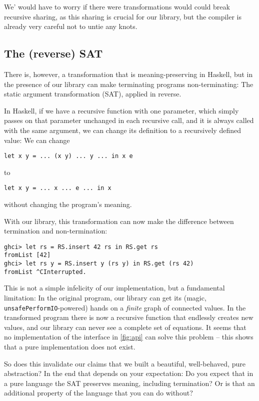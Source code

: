 \documentclass[manuscript,screen,acmsmall]{acmart}
\begin{document}
We’ would have to worry if there were transformations would could break recursive sharing, as this sharing is crucial for our library, but the compiler is already very careful not to untie any knots.

\subsection{The (reverse) SAT}\label{sec:sat}

There is, however, a transformation that is meaning-preserving in Haskell, but in the presence of our library can make terminating programs non-terminating:
The static argument transformation (SAT), applied in reverse.

In Haskell, if we have a recursive function with one parameter, which simply passes on that parameter unchanged in each recursive call, and it is always called with the same argument, we can change its definition to a recursively defined value: We can change
\begin{verbatim}
let x y = ... (x y) ... y ... in x e
\end{verbatim}
to
\begin{verbatim}
let x y = ... x ... e ... in x
\end{verbatim}
without changing the program's meaning.

With our library, this transformation can now make the difference between termination and non-termination:
\begin{verbatim}
ghci> let rs = RS.insert 42 rs in RS.get rs
fromList [42]
ghci> let rs y = RS.insert y (rs y) in RS.get (rs 42)
fromList ^CInterrupted.
\end{verbatim}

This is not a simple infelicity of our implementation, but a fundamental limitation: In the original program, our library can get its (magic, \verb|unsafePerformIO|-powered) hands on a \emph{finite} graph of connected values. In the transformed program there is now a recursive function that endlessly creates new values, and our library can never see a complete set of equations. It seems that no implementation of the interface in \cref{fig:api} can solve this problem -- this shows that a pure implementation does not exist.

So does this invalidate our claims that we built a beautiful, well-behaved, pure abstraction? In the end that depends on your expectation: Do you expect that in a pure language the SAT preserves meaning, including termination? Or is that an additional property of the language that you can do without?
\end{document}
